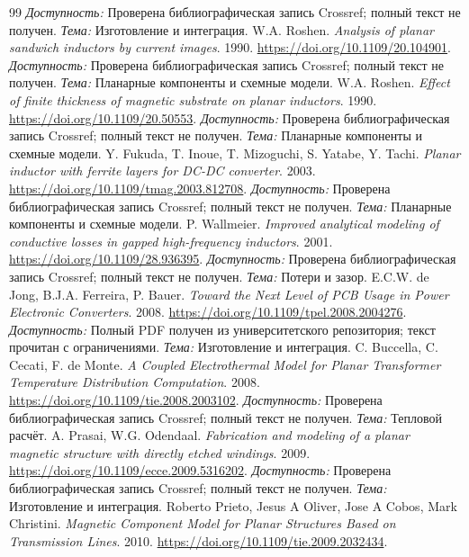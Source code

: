 \documentclass[14pt,a4paper]{extarticle}
\begin{document}
\begin{thebibliography}{99}
\textit{Доступность:} Проверена библиографическая запись Crossref; полный текст не получен. \textit{Тема:} Изготовление и интеграция.
W.A. Roshen. \textit{Analysis of planar sandwich inductors by current images}. 1990.
\url{https://doi.org/10.1109/20.104901}.
\textit{Доступность:} Проверена библиографическая запись Crossref; полный текст не получен. \textit{Тема:} Планарные компоненты и схемные модели.
W.A. Roshen. \textit{Effect of finite thickness of magnetic substrate on planar inductors}. 1990.
\url{https://doi.org/10.1109/20.50553}.
\textit{Доступность:} Проверена библиографическая запись Crossref; полный текст не получен. \textit{Тема:} Планарные компоненты и схемные модели.
Y. Fukuda, T. Inoue, T. Mizoguchi, S. Yatabe, Y. Tachi. \textit{Planar inductor with ferrite layers for DC-DC converter}. 2003.
\url{https://doi.org/10.1109/tmag.2003.812708}.
\textit{Доступность:} Проверена библиографическая запись Crossref; полный текст не получен. \textit{Тема:} Планарные компоненты и схемные модели.
P. Wallmeier. \textit{Improved analytical modeling of conductive losses in gapped high-frequency inductors}. 2001.
\url{https://doi.org/10.1109/28.936395}.
\textit{Доступность:} Проверена библиографическая запись Crossref; полный текст не получен. \textit{Тема:} Потери и зазор.
E.C.W. de Jong, B.J.A. Ferreira, P. Bauer. \textit{Toward the Next Level of PCB Usage in Power Electronic Converters}. 2008.
\url{https://doi.org/10.1109/tpel.2008.2004276}.
\textit{Доступность:} Полный PDF получен из университетского репозитория; текст прочитан с ограничениями. \textit{Тема:} Изготовление и интеграция.
C. Buccella, C. Cecati, F. de Monte. \textit{A Coupled Electrothermal Model for Planar Transformer Temperature Distribution Computation}. 2008.
\url{https://doi.org/10.1109/tie.2008.2003102}.
\textit{Доступность:} Проверена библиографическая запись Crossref; полный текст не получен. \textit{Тема:} Тепловой расчёт.
A. Prasai, W.G. Odendaal. \textit{Fabrication and modeling of a planar magnetic structure with directly etched windings}. 2009.
\url{https://doi.org/10.1109/ecce.2009.5316202}.
\textit{Доступность:} Проверена библиографическая запись Crossref; полный текст не получен. \textit{Тема:} Изготовление и интеграция.
Roberto Prieto, Jesus A Oliver, Jose A Cobos, Mark Christini. \textit{Magnetic Component Model for Planar Structures Based on Transmission Lines}. 2010.
\url{https://doi.org/10.1109/tie.2009.2032434}.

\end{thebibliography}
\end{document}
